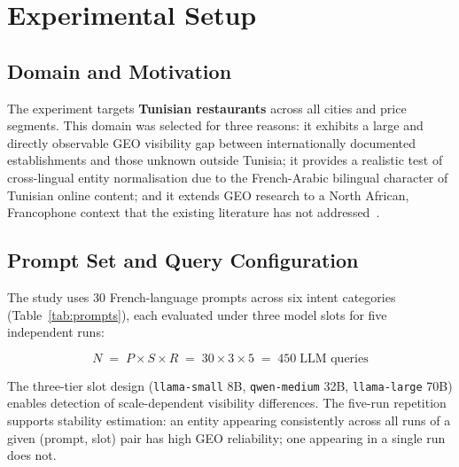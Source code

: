 \section{Experimental Setup}
\label{sec:setup}

\subsection{Domain and Motivation}

The experiment targets \textbf{Tunisian restaurants} across all cities and price
segments. This domain was selected for three reasons: it exhibits a large and directly
observable GEO visibility gap between internationally documented establishments and
those unknown outside Tunisia; it provides a realistic test of cross-lingual entity
normalisation due to the French-Arabic bilingual character of Tunisian online content;
and it extends GEO research to a North African, Francophone context that the
existing literature has not addressed~\cite{aggarwal2023geo}.

\subsection{Prompt Set and Query Configuration}

The study uses 30 French-language prompts across six intent categories
(Table~\ref{tab:prompts}), each evaluated under three model slots for five
independent runs:

\[
N \;=\; P \times S \times R \;=\; 30 \times 3 \times 5 \;=\; 450 \;\text{LLM queries}
\]

The three-tier slot design (\texttt{llama-small} 8B, \texttt{qwen-medium} 32B,
\texttt{llama-large} 70B) enables detection of scale-dependent visibility differences.
The five-run repetition supports stability estimation: an entity appearing consistently
across all runs of a given (prompt, slot) pair has high GEO reliability; one appearing
in a single run does not.

